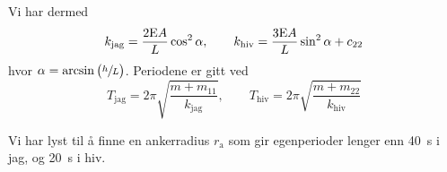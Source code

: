 Vi har dermed
\[
k_{\mathrm{jag}} = \frac{2\mathrm{E} A}{L}\cos^{2}{\alpha}, \qquad k_{\mathrm{hiv}} = \frac{3\mathrm{E} A}{L}\sin^2{\alpha} + c_{22}
\]
hvor $\alpha = \arcsin{\big( \sfrac{h}{L} \big)}$.
Periodene er gitt ved
\[
T_{\mathrm{jag}} = 2\pi\sqrt{\frac{m + m_{11}}{k_{\mathrm{jag}}}}, \qquad T_{\mathrm{hiv}} = 2\pi\sqrt{\frac{m + m_{22}}{k_{\mathrm{hiv}}}}
\]

\vspace{2em}
Vi har lyst til å finne en ankerradius $r_{\mathrm{a}}$ som gir egenperioder lenger enn \SI{40}{\second} i jag, og \SI{20}{\second} i hiv.

